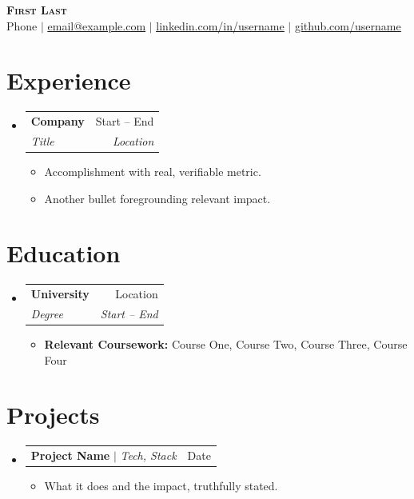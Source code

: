\documentclass[letterpaper,11pt]{article}
\makeatletter
\newcommand{\resumeItem}[1]{
  \item\small{
    {#1 \vspace{-2pt}}
  }
}
\newcommand{\resumeSubheading}[4]{
  \vspace{-2pt}\item
    \begin{tabular*}{0.97\textwidth}[t]{l@{\extracolsep{\fill}}r}
      \textbf{#1} & #2 \\
      \textit{\small#3} & \textit{\small #4} \\
    \end{tabular*}\vspace{-7pt}
}
\newcommand{\resumeProjectHeading}[2]{
    \item
    \begin{tabular*}{0.97\textwidth}{l@{\extracolsep{\fill}}r}
      \small#1 & #2 \\
    \end{tabular*}\vspace{-7pt}
}
\newcommand{\resumeSubHeadingListStart}{\begin{itemize}[leftmargin=0.15in, label={}]}
\newcommand{\resumeSubHeadingListEnd}{\end{itemize}}
\newcommand{\resumeItemListStart}{\begin{itemize}}
\newcommand{\resumeItemListEnd}{\end{itemize}\vspace{-5pt}}
\makeatother
\begin{document}
\begin{center}
    \textbf{\Huge \scshape First Last} \\ \vspace{1pt}
    \small Phone $|$
    \href{mailto:email@example.com}{\underline{email@example.com}} $|$
    \href{https://linkedin.com/in/username}{\underline{linkedin.com/in/username}} $|$
    \href{https://github.com/username}{\underline{github.com/username}}
\end{center}

\section{Experience}
  \resumeSubHeadingListStart

    \resumeSubheading
      {Company}{Start – End}
      {Title}{Location}
      \resumeItemListStart
        \resumeItem{Accomplishment with real, verifiable metric.}
        \resumeItem{Another bullet foregrounding relevant impact.}
      \resumeItemListEnd

  \resumeSubHeadingListEnd

\section{Education}
  \resumeSubHeadingListStart
    \resumeSubheading
      {University}{Location}
      {Degree}{Start – End}
      \resumeItemListStart
        \resumeItem{\textbf{Relevant Coursework:} Course One, Course Two, Course Three, Course Four}
      \resumeItemListEnd
  \resumeSubHeadingListEnd

\section{Projects}
    \resumeSubHeadingListStart
      \resumeProjectHeading
          {\textbf{Project Name} $|$ \emph{Tech, Stack}}{Date}
          \resumeItemListStart
            \resumeItem{What it does and the impact, truthfully stated.}
          \resumeItemListEnd
    \resumeSubHeadingListEnd

\end{document}
